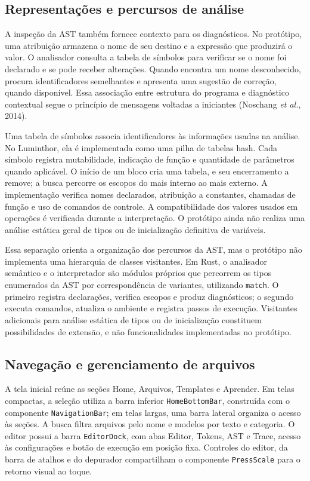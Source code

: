 \documentclass[
    12pt
    ,oneside
    ,a4paper
    ,chapter=TITLE
    ,section=TITLE
    ,sumario=abnt-6027-2012]{abntex2}
\newcommand{\citeNoschang}{(Noschang \textit{et al.}, 2014)}
\begin{document}
\subsection{Representações e percursos de análise}
\label{sec:percursos_ast}

A inspeção da AST também fornece contexto para os diagnósticos. No protótipo, uma atribuição
armazena o nome de seu destino e a expressão que produzirá o valor. O analisador consulta a
tabela de símbolos para verificar se o nome foi declarado e se pode receber alterações.
Quando encontra um nome desconhecido, procura identificadores semelhantes e apresenta uma
sugestão de correção, quando disponível. Essa associação entre estrutura do programa e
diagnóstico contextual segue o princípio de mensagens voltadas a iniciantes \citeNoschang.

Uma tabela de símbolos associa identificadores às informações usadas na análise.
No Luminthor, ela é implementada como uma pilha de tabelas hash. Cada símbolo
registra mutabilidade, indicação de função e quantidade de parâmetros quando aplicável.
O início de um bloco cria uma tabela, e seu encerramento a remove; a busca percorre os escopos
do mais interno ao mais externo. A implementação verifica nomes declarados, atribuição a
constantes, chamadas de função e uso de comandos de controle. A compatibilidade dos valores
usados em operações é verificada durante a interpretação. O protótipo ainda não realiza uma
análise estática geral de tipos ou de inicialização definitiva de variáveis.

Essa separação orienta a organização dos percursos da AST, mas o protótipo não
implementa uma hierarquia de classes visitantes.
Em Rust, o analisador semântico e o interpretador são módulos próprios que percorrem os tipos
enumerados da AST por correspondência de variantes, utilizando \texttt{match}. O primeiro
registra declarações, verifica escopos e produz diagnósticos; o segundo executa comandos,
atualiza o ambiente e registra passos de execução. Visitantes adicionais para análise estática
de tipos ou de inicialização constituem possibilidades de extensão, e não funcionalidades
implementadas no protótipo.

\subsection{Navegação e gerenciamento de arquivos}

A tela inicial reúne as seções Home, Arquivos, Templates e Aprender. Em telas compactas,
a seleção utiliza a barra inferior \texttt{HomeBottomBar}, construída com o componente
\texttt{NavigationBar}; em telas largas, uma barra lateral organiza o acesso às seções.
A busca filtra arquivos pelo nome e modelos por texto e categoria. O editor possui a barra
\texttt{EditorDock}, com abas Editor, Tokens, AST e Trace, acesso às configurações e botão
de execução em posição fixa. Controles do editor, da barra de atalhos e do depurador
compartilham o componente \texttt{PressScale} para o retorno visual ao toque.
\end{document}
